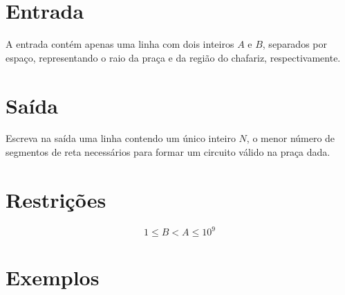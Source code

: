 \section*{Entrada}

A entrada contém apenas uma linha com dois inteiros $A$ e $B$, separados por espaço, representando o raio da praça e da região do chafariz, respectivamente.

\section*{Saída}

Escreva na saída uma linha contendo um único inteiro $N$, o menor número de segmentos de reta necessários para formar um circuito válido na praça
dada.

\section*{Restrições}

$$1 \leq B < A \leq 10^9$$

\section*{Exemplos}
\exemplo
